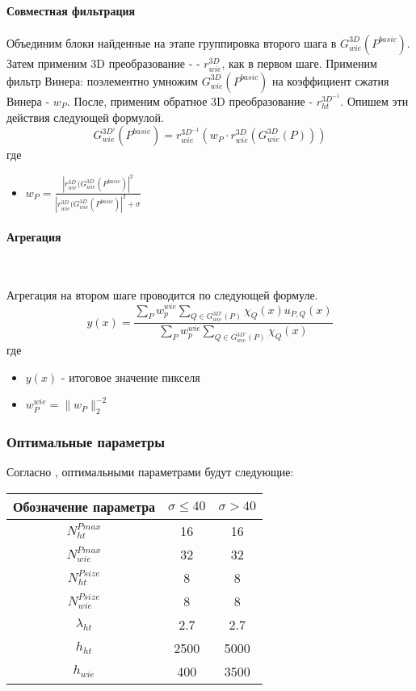 \paragraph{Совместная фильтрация}
Объединим блоки найденные на этапе группировка второго шага в $G_{wie}^{3D}(P^{basic})$. Затем применим 3D преобразование - - $r_{wie}^{3D}$, как в первом шаге. Применим фильтр Винера: поэлементно умножим $G_{wie}^{3D}(P^{basic})$ на коэффициент сжатия Винера - $w_P$. После, применим обратное 3D преобразование - $r_{ht}^{3D^{-1}}$. Опишем эти действия следующей формулой.
\begin{equation}
G_{wie}^{3D'}(P^{basic}) = r_{wie}^{3D^{-1}}(w_P \cdot r_{wie}^{3D}(G_{wie}^{3D}(P)))
\end{equation}
где
\begin{itemize}
\item  $w_P = \frac{|r_{wie}^{3D}(G_{wie}^{3D}(P^{basic})|^2}{|r_{wie}^{3D}(G_{wie}^{3D}(P^{basic})|^2 + \sigma} $
\end{itemize}
\paragraph{Агрегация}\

Агрегация на втором шаге проводится по следующей формуле.
\begin{equation}
y(x) = \frac{\sum\limits_Pw_p^{wie}\sum\limits_{Q \in G_{wie}^{3D'}(P)}\chi_Q(x)u_{P,Q}(x)}{\sum\limits_Pw_p^{wie}\sum\limits_{Q \in G_{wie}^{3D'}(P)}\chi_Q(x)}
\end{equation}
где
\begin{itemize}
	\item $y(x)$ - итоговое значение пикселя
	\item $w_P^{wie}  = \parallel w_P \parallel_2^{-2}$ 
\end{itemize}

\subsubsection{Оптимальные параметры}
Согласно \cite{bm3d}, оптимальными параметрами будут следующие:

\begin{tabular}{|c|c|c|}
	\hline
	Обозначение параметра & $\sigma \leq 40$ & $\sigma > 40$\\
	\hline
	$N_{ht}^{Pmax}$ & 16 & 16 \\
	\hline
	$N_{wie}^{Pmax}$ & 32 & 32 \\
	\hline
	$N_{ht}^{Psize}$ & 8 & 8 \\
	\hline
	$N_{wie}^{Psize}$ & 8 & 8 \\
	\hline
	$\lambda_{ht}$ & 2.7 & 2.7 \\
	\hline
	$h_{ht}$ & 2500 & 5000 \\
	\hline
	$h_{wie}$ & 400 & 3500 \\ 
	\hline
	
\end{tabular}

